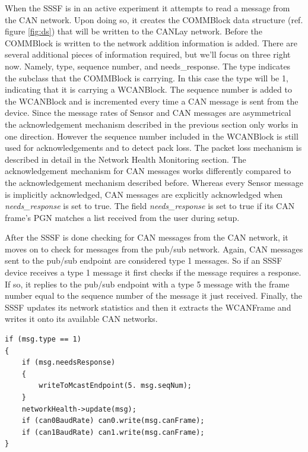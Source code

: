 \documentclass[letterpaper,twocolumn,12pt]{article}
\begin{document}
When the SSSF is in an active experiment it attempts to read a message from the CAN network. Upon doing so, it creates the COMMBlock data structure (ref. figure \ref{fig:ds}) that will be written to the CANLay network. 
Before the COMMBlock is written to the network addition information is added. There are several additional pieces of information required, but we'll focus on three right now. Namely, type, sequence number, and needs\_response. The type indicates the subclass that the COMMBlock is carrying. In this case the type will be 1, indicating that it is carrying a WCANBlock. The sequence number is added to the WCANBlock and is incremented every time a CAN message is sent from the device. Since the message rates of Sensor and CAN messages are asymmetrical the acknowledgement mechanism described in the previous section only works in one direction. However the sequence number included in the WCANBlock is still used for acknowledgements and to detect pack loss. The packet loss mechanism is described in detail in the Network Health Monitoring section. The acknowledgement mechanism for CAN messages works differently compared to the acknowledgement mechanism described before. Whereas every Sensor message is implicitly acknowledged, CAN messages are explicitly acknowledged when \textit{needs\_response} is set to true. The field \textit{needs\_response} is set to true if its CAN frame’s PGN matches a list received from the user during setup.

After the SSSF is done checking for CAN messages from the CAN network, it moves on to check for messages from the pub/sub network. Again, CAN messages sent to the pub/sub endpoint are considered type 1 messages. So if an SSSF device receives a type 1 message it first checks if the message requires a response. If so, it replies to the pub/sub endpoint with a type 5 message with the frame number equal to the sequence number of the message it just received. Finally, the SSSF updates its network statistics and then it extracts the WCANFrame and writes it onto its available CAN networks.
\begin{verbatim}
if (msg.type == 1)
{
    if (msg.needsResponse)
    {
        writeToMcastEndpoint(5. msg.seqNum);
    }
    networkHealth->update(msg);
    if (can0BaudRate) can0.write(msg.canFrame);
    if (can1BaudRate) can1.write(msg.canFrame);
}
\end{verbatim}
\end{document}
